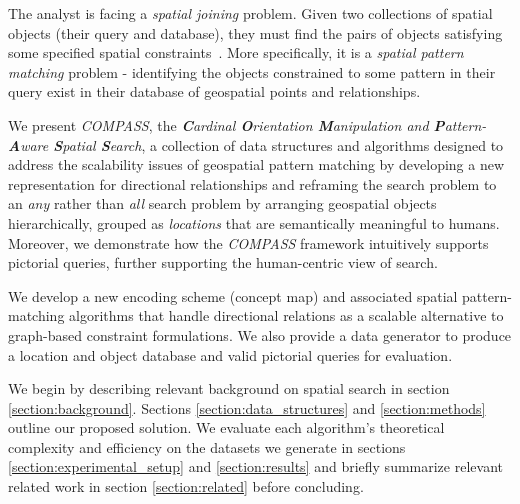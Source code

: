 \par{
     The analyst is facing a \textit{spatial joining} problem. Given two collections of spatial objects (their query and database), they must find the pairs of objects satisfying some specified spatial constraints~\cite{Jacox2007}. 
    More specifically, it is a \textit{spatial pattern matching} problem - identifying the objects constrained to some pattern in their query exist in their database of geospatial points and relationships.
}
\par{
    We present \emph{COMPASS}, the \textit{\textbf{C}ardinal \textbf{O}rientation \textbf{M}anipulation and \textbf{P}attern-\textbf{A}ware \textbf{S}patial \textbf{S}earch}, a collection of data structures and algorithms designed to address the scalability issues of geospatial pattern matching by developing a new representation for directional relationships and reframing the search problem to an \textit{any} rather than \textit{all} search problem by arranging geospatial objects hierarchically, grouped as \textit{locations} that are semantically meaningful to humans.
    Moreover, we demonstrate how the \emph{COMPASS} framework intuitively supports pictorial queries, further supporting the human-centric view of search.   

    We develop a new encoding scheme (concept map) and associated spatial pattern-matching algorithms that handle directional relations as a scalable alternative to graph-based constraint formulations.
    We also provide a data generator to produce a location and object database and valid pictorial queries for evaluation.
 
    We begin by describing relevant background on spatial search in section \ref{section:background}. Sections \ref{section:data_structures} and \ref{section:methods} outline our proposed solution. We evaluate each algorithm's theoretical complexity and efficiency on the datasets we generate in sections \ref{section:experimental_setup} and \ref{section:results} and briefly summarize relevant related work in section \ref{section:related} before concluding.
}


